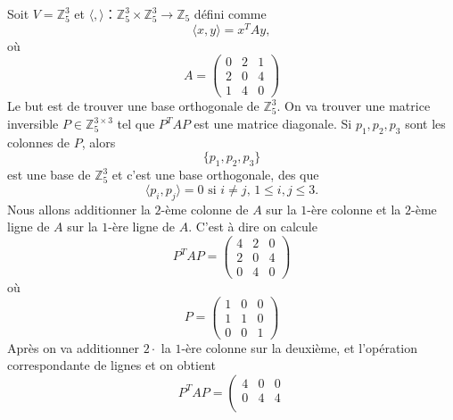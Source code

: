 \begin{example}
  \label{exe:30}
  Soit $V = ℤ_5^3$ et $〈,〉： ℤ_5^3 × ℤ_5^3 → ℤ_5$ défini comme
  \begin{displaymath}
    〈x,y〉 = x^T A y,
  \end{displaymath}
  où
  \begin{displaymath}
    A = \left(\begin{array}{rrr}
                0 & 2 & 1 \\
                2 & 0 & 4 \\
                1 & 4 & 0
              \end{array}\right)
  \end{displaymath}
  Le but est de trouver une base orthogonale de $ℤ_5^3$. On va trouver une matrice inversible $P ∈ ℤ_5^{3×3}$ tel que $P^T A P$  est une matrice diagonale. Si  $p_1,p_2,p_3$ sont les colonnes de $P$, alors
  \begin{displaymath}
    \{ p_1,p_2,p_3 \}
  \end{displaymath}
  est une base de $ℤ_5^3$ et c'est une base orthogonale, des que
  \begin{displaymath}
    〈p_i,p_j〉 =0 \text{ si } i ≠j, \, 1 ≤i,j ≤3. 
  \end{displaymath}
  Nous allons additionner la $2$-ème colonne de $A$  sur la $1$-ère colonne et la $2$-ème ligne  de $A$  sur la $1$-ère ligne  de $A$. C'est à dire on calcule
  \begin{displaymath}
    P^T A P  = \left(\begin{array}{rrr}
4 & 2 & 0 \\
2 & 0 & 4 \\
0 & 4 & 0
\end{array}\right)
  \end{displaymath}
  où
  \begin{displaymath}
P  =  \left(\begin{array}{rrr}
1 & 0 & 0 \\
1 & 1 & 0 \\
0 & 0 & 1
\end{array}\right)
  \end{displaymath}
  Après on va additionner $2⋅$ la $1$-ère colonne sur la deuxième, et l'opération correspondante de lignes et on obtient 
  \begin{displaymath}
    P^T A P  =
    \left(\begin{array}{rrr}
            4 & 0 & 0 \\
            0 & 4 & 4 \\

\end{array}
\end{displaymath}
\end{example}
